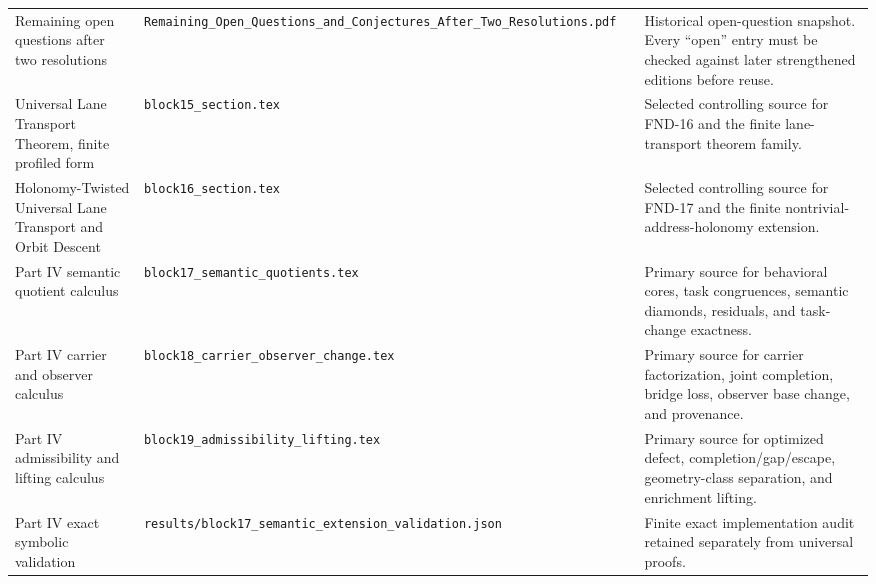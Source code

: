 \begin{longtable}{@{}L{0.18\textwidth}L{0.22\textwidth}L{0.25\textwidth}L{0.29\textwidth}@{}}
Remaining open questions after two resolutions & \nolinkurl{Remaining_Open_Questions_and_Conjectures_After_Two_Resolutions.pdf} & \texttt{} & Historical open-question snapshot. Every ``open'' entry must be checked against later strengthened editions before reuse.\\[3pt]
Universal Lane Transport Theorem, finite profiled form & \nolinkurl{block15_section.tex} & \texttt{} & Selected controlling source for FND-16 and the finite lane-transport theorem family.\\[3pt]
Holonomy-Twisted Universal Lane Transport and Orbit Descent & \nolinkurl{block16_section.tex} & \texttt{} & Selected controlling source for FND-17 and the finite nontrivial-address-holonomy extension.\\[3pt]
Part IV semantic quotient calculus & \nolinkurl{block17_semantic_quotients.tex} & \texttt{} & Primary source for behavioral cores, task congruences, semantic diamonds, residuals, and task-change exactness.\\[3pt]
Part IV carrier and observer calculus & \nolinkurl{block18_carrier_observer_change.tex} & \texttt{} & Primary source for carrier factorization, joint completion, bridge loss, observer base change, and provenance.\\[3pt]
Part IV admissibility and lifting calculus & \nolinkurl{block19_admissibility_lifting.tex} & \texttt{} & Primary source for optimized defect, completion/gap/escape, geometry-class separation, and enrichment lifting.\\[3pt]
Part IV exact symbolic validation & \nolinkurl{results/block17_semantic_extension_validation.json} & \texttt{} & Finite exact implementation audit retained separately from universal proofs.\\[3pt]
\end{longtable}
\endgroup
